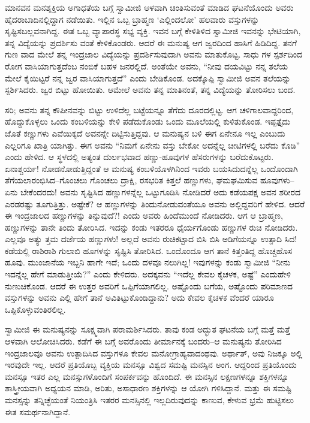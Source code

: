 ಮಾನವನ ಮನಶ್ಶಕ್ತಿಯ ಅಗಾಧತೆಯ ಬಗ್ಗೆ ಸ್ವಾಮೀಜಿ ಆಳವಾಗಿ ಚಿಂತಿಸುವಂತೆ ಮಾಡಿದ ಘಟನೆಯೊಂದು ಅವರು ಹೈದರಾಬಾದಿನಲ್ಲಿದ್ದಾಗ ನಡೆಯಿತು. ಇಲ್ಲಿನ ಒಬ್ಬ ಬ್ರಾಹ್ಮಣ ‘ಎಲ್ಲಿಂದಲೋ’ ಹಲವಾರು ವಸ್ತುಗಳನ್ನು ಸೃಷ್ಟಿಸಬಲ್ಲವನಾಗಿದ್ದ. ಈತ ಒಬ್ಬ ವ್ಯಾಪಾರಸ್ಥ ಸಭ್ಯ ವ್ಯಕ್ತಿ. ಇವನ ಬಗ್ಗೆ ಕೇಳಿತಿಳಿದ ಸ್ವಾಮೀಜಿ ಇವನನ್ನು ಭೇಟಿಯಾಗಿ, ತನ್ನ ವಿದ್ಯೆಯನ್ನು ಪ್ರದರ್ಶಿಸು ವಂತೆ ಕೇಳಿಕೊಂಡರು. ಆದರೆ ಈ ಮನುಷ್ಯ ಆಗ ಜ್ವರದಿಂದ ಹಾಸಿಗೆ ಹಿಡಿದಿದ್ದ. ತನಗೆ ಗುಣ ವಾದ ಮೇಲೆ ತನ್ನ ಇಂದ್ರಜಾಲ ವಿದ್ಯೆಯನ್ನು ಪ್ರದರ್ಶಿಸುವುದಾಗಿ ಅವನು ಮಾತುಕೊಟ್ಟ. ಸಾಧು ಗಳ ಸ್ಪರ್ಶದಿಂದ ರೋಗ ವಾಸಿಯಾಗುತ್ತದೆಂಬ ನಂಬಿಕೆ ಬಹಳ ಜನರಲ್ಲಿದೆ. ಅಂತೆಯೇ ಅವನು, “ನೀವು ದಯವಿಟ್ಟು ನನ್ನ ತಲೆಯ ಮೇಲೆ ಕೈಯಿಟ್ಟರೆ ನನ್ನ ಜ್ವರ ವಾಸಿಯಾಗುತ್ತದೆ” ಎಂದು ಬೇಡಿಕೊಂಡ. ಅದಕ್ಕೊಪ್ಪಿ ಸ್ವಾಮೀಜಿ ಅವನ ತಲೆಯನ್ನು ಸ್ಪರ್ಶಿಸಿದರು. ಜ್ವರ ಬಿಟ್ಟು ಹೋಯಿತು. ಆಮೇಲೆ ಅವನು ತನ್ನ ಮಾತಿನಂತೆ, ತನ್ನ ವಿದ್ಯೆಯನ್ನು ತೋರಿಸಲು ಬಂದ.

ಸರಿ; ಅವನು ತನ್ನ ಕೌಪೀನವನ್ನು ಬಿಟ್ಟು ಉಳಿದೆಲ್ಲ ಬಟ್ಟೆಯನ್ನೂ ತೆಗೆದು ದೂರದಲ್ಲಿಟ್ಟ. ಆಗ ಚಳಿಗಾಲವಾದ್ದರಿಂದ, ಹೊದ್ದುಕೊಳ್ಳಲು ಒಂದು ಕಂಬಳಿಯನ್ನು ಕೇಳಿ ಪಡೆದುಕೊಂಡು ಒಂದು ಮೂಲೆಯಲ್ಲಿ ಕುಳಿತುಕೊಂಡ. ಇಪ್ಪತ್ತೈದು ಜೊತೆ ಕಣ್ಣುಗಳು ಎವೆಯಿಕ್ಕದೆ ಅವನನ್ನೇ ದಿಟ್ಟಿಸುತ್ತಿದ್ದವು. ಆ ಮನುಷ್ಯನ ಬಳಿ ಈಗ ಏನೇನೂ ಇಲ್ಲ ಎಂಬುದು ಎಲ್ಲರಿಗೂ ಖಾತ್ರಿ ಯಾಗಿತ್ತು. ಈಗ ಅವನು “ನಿಮಗೆ ಏನೇನು ವಸ್ತು ಬೇಕೋ ಅದನ್ನೆಲ್ಲ ಚೀಟಿಗಳಲ್ಲಿ ಬರೆದು ಕೊಡಿ” ಎಂದು ಹೇಳಿದ. ಆ ಸ್ಥಳದಲ್ಲಿ ಅತ್ಯಂತ ದುರ್ಲಭವಾದ ಹಣ್ಣು-ಹೂವುಗಳ ಹೆಸರುಗಳನ್ನು ಬರೆದುಕೊಟ್ಟರು. ಏನಾಶ್ಚರ್ಯ! ನೋಡನೋಡುತ್ತಿದ್ದಂತೆ ಆ ಮನುಷ್ಯ ಕಂಬಳಿಯೊಳಗಿನಿಂದ ಇವರು ಬಯಸಿದುದನ್ನೆಲ್ಲ ಒಂದೊಂದಾಗಿ ತೆಗೆಯಲಾರಂಭಿಸಿದ–ಗೊಂಚಲು ಗೊಂಚಲು ದ್ರಾಕ್ಷಿ, ರಸಭರಿತ ಕಿತ್ತಲೆ ಹಣ್ಣುಗಳು, ಘಮಘಮಿಸುವ ಹೂವುಗಳು– ಏನು ಬೇಕೆಂದರದು! ಅವನು ಸೃಷ್ಟಿಸಿದ ಹಣ್ಣುಗಳನ್ನೆಲ್ಲ ಒಟ್ಟುಗೂಡಿಸಿ ನೋಡಿದರೆ ಅದು ಕಡೆಯಪಕ್ಷ ಅವನ ಶರೀರದ ಎರಡರಷ್ಟು ತೂಗುತ್ತಿತ್ತು. ಅಷ್ಟೇಕೆ? ಆ ಹಣ್ಣುಗಳನ್ನು ತಿಂದುನೋಡುವಂತೆಯೂ ಅವನು ಅಲ್ಲಿದ್ದವರಿಗೆ ಹೇಳಿದ. ಆದರೆ ಈ ಇಂದ್ರಜಾಲದ ಹಣ್ಣುಗಳನ್ನು ತಿನ್ನುವುದೆ?! ಎಂದು ಅವರು ಹಿಂದೆಮುಂದೆ ನೋಡಿದರು. ಆಗ ಆ ಬ್ರಾಹ್ಮಣ, ಹಣ್ಣುಗಳನ್ನು ತಾನೇ ತಿಂದು ತೋರಿಸಿದ. ಇದನ್ನು ಕಂಡು ಇತರರೂ ಧೈರ್ಯಗೊಂಡು ಹಣ್ಣುಗಳ ರುಚಿ ನೋಡಿದರು. ಎಲ್ಲವೂ ಅತ್ಯು ತ್ತಮ ದರ್ಜೆಯ ಹಣ್ಣುಗಳು! ಅಲ್ಲದೆ ಅವನು ರುಚಿಕಟ್ಟಾದ ಬಿಸಿ ಬಿಸಿ ಅಡಿಗೆಯನ್ನೂ ಉತ್ಪಾದಿ ಸಿದ!ಕಡೆಯಲ್ಲಿ ರಾಶಿರಾಶಿ ಗುಲಾಬಿ ಹೂಗಳನ್ನು ಸೃಷ್ಟಿಸಿ ತೋರಿಸಿದ. ಒಂದೊಂದೂ ಆಗ ತಾನೆ ಕಿತ್ತಂತಿದ್ದ ಹೊಚ್ಚಹೊಸ ಹೂವು. ಮುಂಜಾನೆಯ ಇಬ್ಬನಿ ಹಾಗೇ ಇದೆ; ಒಂದು ದಳವೂ ನಲುಗಿಲ್ಲ! ಇವುಗಳನ್ನು ಕಂಡು ಸ್ವಾಮೀಜಿ “ನೀನು ಇದನ್ನೆಲ್ಲ ಹೇಗೆ ಮಾಡುತ್ತೀಯೆ?” ಎಂದು ಕೇಳಿದರು. ಅದಕ್ಕವನು “ಇದೆಲ್ಲ ಕೇವಲ ಕೈಚಳಕ, ಅಷ್ಟೆ” ಎಂದುಹೇಳಿ ನುಣುಚಿಕೊಂಡ. ಆದರೆ ಈ ಉತ್ತರ ಅವರಿಗೆ ಒಪ್ಪಿಗೆಯಾಗಲಿಲ್ಲ. ಅಷ್ಟೊಂದು ಬಗೆಯ, ಅಷ್ಟೊಂದು ಪರಿಮಾಣದ ವಸ್ತುಗಳನ್ನು ಅವನು ಎಲ್ಲಿ ಹೇಗೆ ತಾನೆ ಅವಿತಿಟ್ಟುಕೊಂಡಿದ್ದಾನು? ಅದು ಕೇವಲ ಕೈಚಳಕ ವೆಂದರೆ ಯಾರೂ ಒಪ್ಪಿಕೊಳ್ಳುವಂತಿರಲಿಲ್ಲ.

ಸ್ವಾಮೀಜಿ ಈ ಮನುಷ್ಯನನ್ನು ಸೂಕ್ಷ್ಮವಾಗಿ ಪರಾಮರ್ಶಿಸಿದರು. ತಾವು ಕಂಡ ಅದ್ಭುತ ಘಟನೆಯ ಬಗ್ಗೆ ಮತ್ತೆ ಮತ್ತೆ ಆಳವಾಗಿ ಆಲೋಚಿಸಿದರು. ಕಡೆಗೆ ಈ ಬಗ್ಗೆ ಅವರೊಂದು ತೀರ್ಮಾನಕ್ಕೆ ಬಂದರು–ಆ ಮನುಷ್ಯನು ತೋರಿಸಿದ ಇಂದ್ರಜಾಲವೂ ಅವನು ಉತ್ಪಾದಿಸಿದ ವಸ್ತುಗಳೂ ಕೇವಲ ಮನೋಗ್ರಾಹ್ಯವಾದಂಥವು. ಅರ್ಥಾತ್, ಅವು ನಿಜಕ್ಕೂ ಅಲ್ಲಿ ಇರವುದೇ ಇಲ್ಲ. ಆದರೆ ಪ್ರತಿಯೊಬ್ಬ ವ್ಯಕ್ತಿಯ ಮನಸ್ಸೂ ವಿಶ್ವದ ಸಮಷ್ಟಿ ಮನಸ್ಸಿನ ಅಂಗ. ಆದ್ದರಿಂದ ಪ್ರತಿಯೊಂದು ಮನಸ್ಸೂ ಇತರ ಎಲ್ಲ ಮನಸ್ಸುಗಳೊಂದಿಗೆ ಸಂಪರ್ಕವನ್ನು ಹೊಂದಿದೆ. ಈ ಮನಸ್ಸಿನ ಲಕ್ಷಣಗಳನ್ನೂ ಶಕ್ತಿಗಳನ್ನೂ ಶಾಸ್ತ್ರೀಯವಾಗಿ ಅಧ್ಯಯನ ಮಾಡಿ, ಅರಿತು, ಅಸಾಧಾರಣ ಶಕ್ತಿಗಳನ್ನು ಆ ಯೋಗಿ ಗಳಿಸಿದ್ದಾನೆ. ಮತ್ತು ಈ ಸಮಷ್ಟಿ ಮನಸ್ಸನ್ನು ತನ್ನಿಚ್ಛೆಯಂತೆ ನಿಯಂತ್ರಿಸಿ ಇತರರ ಮನಸ್ಸಿನಲ್ಲಿ ಇಲ್ಲದಿರುವುದನ್ನು ಕಾಣುವ, ಕೇಳುವ ಭ್ರಮೆ ಹುಟ್ಟಿಸಲು ಈತ ಸಮರ್ಥನಾಗಿದ್ದಾನೆ.

